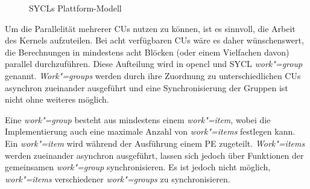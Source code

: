 \begin{figure}
    \caption{SYCLs Plattform-Modell \cite[nach][23]{opencl2012}}
    \label{sycl:konzepte:abstraktion:plattform}
\end{figure}

Um die Parallelität mehrerer CUs nutzen zu können, ist es sinnvoll, die Arbeit
des Kernels aufzuteilen. Bei acht verfügbaren CUs wäre es daher wünschenswert,
die Berechnungen in mindestens acht Blöcken (oder einem Vielfachen davon)
parallel durchzuführen. Diese Aufteilung wird in \gls{opencl} und SYCL
\textit{work"=group} genannt. \textit{Work"=groups} werden durch ihre Zuordnung
zu unterschiedlichen CUs asynchron zueinander ausgeführt und eine
Synchronisierung der Gruppen ist nicht ohne weiteres möglich.

Eine \textit{work"=group} besteht aus mindestens einem \textit{work"=item},
wobei die Implementierung auch eine maximale Anzahl von \textit{work"=items}
festlegen kann. Ein \textit{work"=item} wird während der Ausführung einem PE
zugeteilt. \textit{Work"=items} werden zueinander asynchron ausgeführt, lassen
sich jedoch über Funktionen der gemeinsamen \textit{work"=group}
synchronisieren. Es ist jedoch nicht möglich, \textit{work"=items} verschiedener
\textit{work"=groups} zu synchronisieren.

